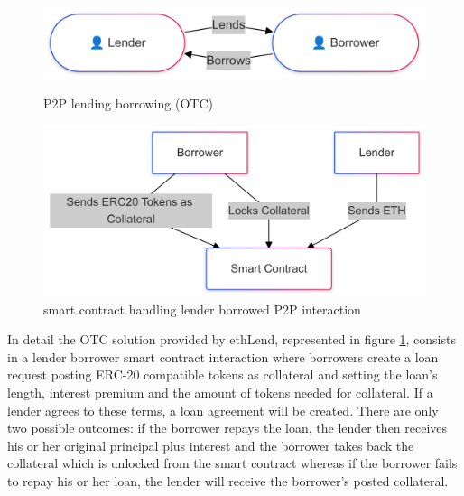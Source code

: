 \documentclass[11pt,a4paper,titlepage]{scrartcl}
\begin{document}
\begin{figure}[ht]
    \centering
    \begin{minipage}[t]{0.45\textwidth} %
        \centering
        \includegraphics[width=\textwidth]{image/otclendborrow.png}
        \caption{P2P lending borrowing (OTC)}
        \label{fig:peer_lending}
    \end{minipage}
    \hfill %
    \begin{minipage}[t]{0.45\textwidth} %
        \centering
        \includegraphics[width=\textwidth]{image/lenderborrowerOTC}
        \caption{smart contract handling lender borrowed P2P interaction}
        \label{fig:lending_contract}
    \end{minipage}
    \FloatBarrier
\end{figure}

In detail the OTC solution  provided by ethLend, represented in figure \ref{fig:lending_contract}, consists in a lender borrower smart contract interaction where  borrowers create a loan request  posting  ERC-20 compatible tokens  as collateral and setting  the loan’s length, interest premium and the amount of tokens needed for collateral. If a lender agrees to these terms, a loan agreement will be created.
There are only two possible outcomes: if the borrower repays the loan, the lender then receives his or her original principal plus interest and the borrower takes back the collateral which is unlocked from the smart contract whereas if the borrower fails to repay his or her loan, the lender will receive the borrower’s posted collateral. 
\end{document}
